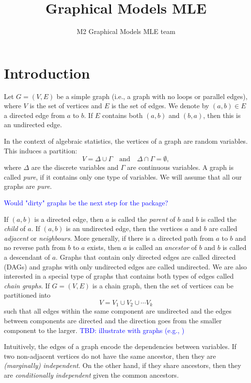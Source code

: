 \documentclass[10pt,a4paper]{article}
\author{M2 Graphical Models MLE team}
\title{Graphical Models MLE}
\begin{document}
\maketitle

\tableofcontents
\section{Introduction}
Let $G=(V,E)$ be a simple graph (i.e., a graph with no loops or parallel edges), where $V$ is the set of vertices and $E$ is the set of edges. We denote by $(a,b)\in E$ a directed edge from $a$ to $b$. If $E$ contains both $(a,b)$ and $(b,a)$, then this is an undirected edge. 

In the context of algebraic statistics, the vertices of a graph are random variables. This induces a partition:
\[V=\Delta \cup \Gamma \quad \text{and} \quad \Delta \cap \Gamma=\emptyset,\]
where $\Delta$ are the discrete variables and $\Gamma$ are continuous variables. A graph is called \emph{pure}, if it contains only one type of variables.  We will assume that all our graphs are \emph{pure}.

\textcolor{blue}{Would "dirty" graphs be the next step for the package?}

If $(a,b)$ is a directed edge, then $a$ is called the \emph{parent} of $b$ and $b$ is called the \emph{child} of $a$. If $(a,b)$ is an undirected edge, then the vertices $a$ and $b$ are called \emph{adjacent} or \emph{neighbours}. More generally, if there is a directed path from $a$ to $b$ and no reverse path from $b$ to $a$ exists, then $a$ is called an \emph{ancestor} of $b$ and $b$ is called a descendant of $a$. 
Graphs that contain only directed edges are called directed (DAGs) and graphs with only undirected edges are called undirected. We are also interested in a special type of graphs that contains both types of edges called \emph{chain graphs}. If $G=(V,E)$ is a chain graph, then the set of vertices can be partitioned into
\[V=V_1 \cup V_2 \cup \cdots V_k\]
such that all edges within the same component are undirected and the edges between components are directed and the direction goes from the smaller component to the larger. 
\textcolor{blue}{TBD: illustrate with graphs (e.g., \cite[p. 6 Fig 2.2]{lauritzen1996graphical} )}

Intuitively, the edges of a graph encode the dependencies between variables. If two non-adjacent vertices do not have the same ancestor, then they are \emph{(marginally) independent}. On the other hand, if they share  ancestors, then they are \emph{conditionally independent} given the common ancestors. 
\end{document}
